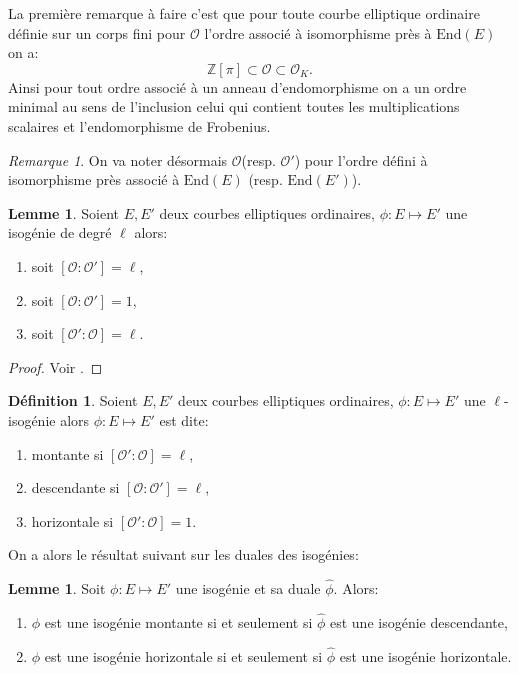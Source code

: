 \documentclass[10pt,a4paper]{book}
\theoremstyle{plain}
\theoremstyle{definition}
\newtheorem{lem}[thm]{Lemme}
\theoremstyle{definition}
\theoremstyle{definition}
\theoremstyle{definition}
\newtheorem{defi}[thm]{Définition}
\theoremstyle{remark}
\newtheorem{rem}[thm]{Remarque}
\theoremstyle{remark}
\theoremstyle{definition}
\begin{document}
La première remarque à faire c'est que pour toute courbe elliptique ordinaire définie sur un corps fini pour $\mathcal{O}$ l'ordre associé à isomorphisme près à $\mathrm{End}(E)$ on a: 
\[
\mathbb{Z}[\pi] \subset \mathcal{O} \subset \mathcal{O}_K.
\]
Ainsi pour tout ordre associé à un anneau d'endomorphisme on a un ordre minimal
au sens de l'inclusion celui qui contient toutes les multiplications scalaires 
et l'endomorphisme de Frobenius.

\begin{rem}
On va noter désormais $\mathcal{O}$(resp. $\mathcal{O}'$) pour l'ordre défini à isomorphisme près associé à $\mathrm{End}(E)$ (resp. $\mathrm{End}(E')$).
\end{rem}

\begin{lem}
Soient $E,E'$ deux courbes elliptiques ordinaires, $\phi: E \mapsto E'$ une isogénie de degré $\ell$ alors:
\begin{enumerate}
\item soit $[\mathcal{O} : \mathcal{O'}]=\ell$, 
\item soit $[\mathcal{O} : \mathcal{O'}]=1$,
\item soit $[\mathcal{O'} : \mathcal{O}]=\ell$.
\end{enumerate}
\end{lem}

\begin{proof}
Voir \cite[Proposition 21]{Kohel96}.
\end{proof}

\begin{defi}
\label{def:iso:nom}
Soient $E,E'$ deux courbes elliptiques ordinaires, $\phi: E \mapsto E'$ une $\ell$-isogénie alors $\phi: E \mapsto E'$ est dite:
\begin{enumerate}
\item montante si $[\mathcal{O'} : \mathcal{O}]=\ell$,
\item descendante si $[\mathcal{O} : \mathcal{O'}]=\ell$,
\item horizontale si $[\mathcal{O'} : \mathcal{O}]=1$.
\end{enumerate}
\end{defi}

On a alors le résultat suivant sur les duales des isogénies:
\begin{lem}
\label{lem:dua:vol}
Soit $\phi : E \mapsto E'$ une isogénie et sa duale $\widehat{\phi}$. Alors:
\begin{enumerate}
\item $\phi$ est une isogénie montante si et seulement si $\widehat{\phi}$ est une isogénie descendante,
\item $\phi$ est une isogénie horizontale si et seulement si $\widehat{\phi}$ est une isogénie horizontale.
\end{enumerate}
\end{lem}
\end{document}
